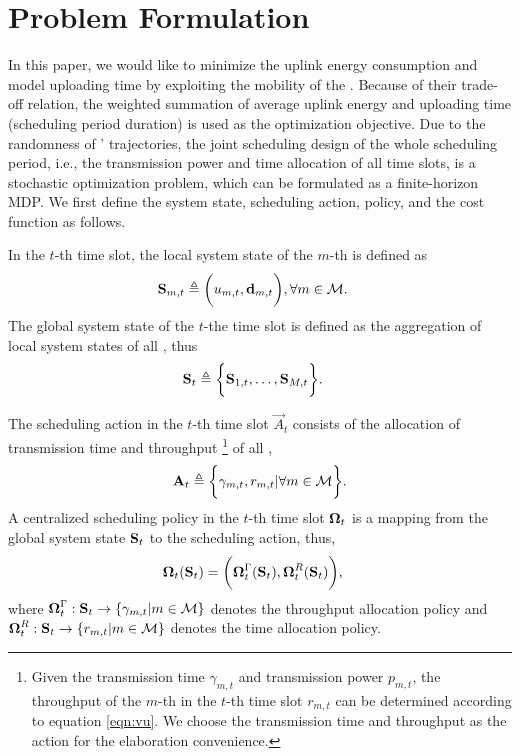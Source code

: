 \section{Problem Formulation}
\label{sec:formulation}
In this paper, we would like to minimize the uplink energy consumption and model uploading time by exploiting the mobility of the {\IAVs}.
Because of their trade-off relation, the weighted summation of average uplink energy and uploading time (scheduling period duration) is used as the optimization objective.
Due to the randomness of {\IAVs}' trajectories, the joint scheduling design of the whole scheduling period, i.e., the transmission power and time allocation of all time slots, is a stochastic optimization problem, which can be formulated as a finite-horizon MDP.
We first define the system state, scheduling action, policy, and the cost function as follows.

\begin{definition}
    \label{def:mdp}
    In the $t$-th time slot, the local system state of the $m$-th {\IAV} is defined as
    \begin{align}
        \mathbf{S}_{m,t} &\triangleq \bigg( u_{m,t}, \mathbf{d}_{m,t} \bigg), \forall m\in\mathcal{M}.
    \end{align}
    The global system state of the $t$-the time slot is defined as the aggregation of local system states of all {\IAVs}, thus
    \begin{align}
        \mathbf{S}_t &\triangleq \bigg\{ \mathbf{S}_{1,t}, \dots, \mathbf{S}_{M,t} \bigg\}.
    \end{align}

    The scheduling action in the $t$-th time slot $\vec{A}_{t}$ consists of the allocation of transmission time and throughput%
    \footnote{
        Given the transmission time $\gamma_{m,t}$ and transmission power $p_{m,t}$,
        the throughput of the $m$-th {\IAV} in the $t$-th time slot $r_{m,t}$ can be determined according to equation \eqref{eqn:vu}.
        We choose the transmission time and throughput as the action for the elaboration convenience.
    }
    of all {\IAVs},
    \begin{align}
        \mathbf{A}_{t} \triangleq \bigg\{ \gamma_{m,t}, r_{m,t} | \forall m\in\mathcal{M} \bigg\}.
    \end{align}
    A centralized scheduling policy in the $t$-th time slot $\boldsymbol{\Omega}_{t}$ is a mapping from the global system state $\mathbf{S}_{t}$ to the scheduling action, thus,
    \begin{align}
        \boldsymbol{\Omega}_{t}(\mathbf{S}_t) &= \bigg( \boldsymbol{\Omega}^{\Gamma}_{t}(\mathbf{S}_t), \boldsymbol{\Omega}^{R}_{t}(\mathbf{S}_t) \bigg),
    \end{align}
    where $\boldsymbol{\Omega}^{\Gamma}_{t}: \mathbf{S}_{t} \to \{\gamma_{m,t} | m\in\mathcal{M}\}$ denotes the throughput allocation policy and $\boldsymbol{\Omega}^{R}_{t}: \mathbf{S}_{t} \to \{r_{m,t} | m\in\mathcal{M}\}$ denotes the time allocation policy.
\end{definition}

